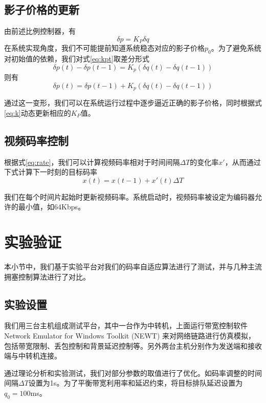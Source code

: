    \subsection{影子价格的更新}
    由前述比例控制器，有
    \begin{equation}\label{eq:kpt}
        \delta p = K_P \delta q
    \end{equation}
    在系统实现角度，我们不可能提前知道系统稳态对应的影子价格$p_0$。为了避免系统对初始值的依赖，我们对式\ref{eq:kpt}取差分形式
    \begin{equation}
        \delta p(t) - \delta p(t-1) = K_p(\delta q(t) - \delta q(t-1))
    \end{equation}
    则有
    \begin{equation}
        \delta p(t) = \delta p(t-1) + K_p(\delta q(t) - \delta q(t-1))
    \end{equation}

    通过这一变形，我们可以在系统运行过程中逐步逼近正确的影子价格，同时根据式\ref{eq:k}动态更新相应的$K_P$值。

    \subsection{视频码率控制}
    根据式\ref{eq:rate}，我们可以计算视频码率相对于时间间隔$\Delta{T}$的变化率$x'$，从而通过下式计算下一时刻的目标码率
    \begin{equation}
        x(t) = x(t-1) + x'(t) \Delta{T}
    \end{equation}

    我们在每个时间片起始时更新视频码率。系统启动时，视频码率被设定为编码器允许的最小值，如64Kbps。


\section{实验验证}
本小节中，我们基于实验平台对我们的码率自适应算法进行了测试，并与几种主流拥塞控制算法进行了对比。

    \subsection{实验设置}
    我们用三台主机组成测试平台，其中一台作为中转机，上面运行带宽控制软件Network Emulator for Windows Toolkit (NEWT) 来对网络链路进行仿真模拟，包括带宽限制、丢包控制和背景延迟控制等。另外两台主机分别作为发送端和接收端与中转机连接。

    通过理论分析和实验测试，我们对部分参数的取值进行了优化。如码率调整的时间间隔$\Delta T$设置为1s。为了平衡带宽利用率和延迟约束，将目标排队延迟设置为$q_0 = 100$ms。


